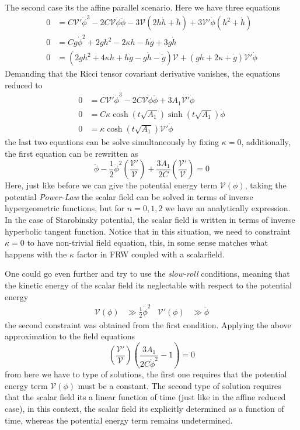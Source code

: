 \documentclass[10pt,a4paper]{article}
\begin{document}
The second case its the affine parallel scenario. Here we have three equations
\begin{align}
  0 & = C\mathcal{V}'\dot{\phi}^3-2C\mathcal{V}\dot{\phi}\ddot{\phi} - 3\mathcal{V}\left(2h\dot{h} + \ddot{h}\right) + 3\mathcal{V}'\dot{\phi}
  \left(h^{2} + \dot{h}\right) \\
  0 & = Cg\dot{\phi}^2 + 2gh^2 - 2\kappa h - h\dot{g} + 3g\dot{h} \\
  0 & = \left(2gh^2 + 4\kappa h +h\dot{g} - g \dot{h} - \ddot{g}\right)\mathcal{V} + \left(gh + 2\kappa + \dot{g}\right)\mathcal{V}'\dot{\phi}
\end{align}
Demanding that the Ricci tensor covariant derivative vanishes, the equations reduced to
\begin{align}
  0 & = C\mathcal{V}'\dot{\phi}^3 - 2C\mathcal{V}\dot{\phi}\ddot{\phi} + 3A_1 \mathcal{V}'\dot{\phi}\\
  0 & = C\kappa \cosh(t\sqrt{A_1})\sinh(t\sqrt{A_1})\dot{\phi} \\
  0 & = \kappa \cosh(t\sqrt{A_1})\mathcal{V}'\dot{\phi}
\end{align}
the last two equations can be solve simultaneously by fixing $\kappa = 0$, additionally, the first equation can be rewritten as
\begin{equation}
  \ddot{\phi} - \frac{1}{2}\dot{\phi}^2\left(\frac{\mathcal{V}'}{\mathcal{V}}\right) + \frac{3A_1}{2C}\left(\frac{\mathcal{V}'}{\mathcal{V}}\right) = 0
\end{equation}
Here, just like before we can give the potential energy term $\mathcal{V}(\phi)$, taking the potential \textit{Power-Law} the scalar field
can be solved in terms of inverse hypergeometric functions, but for $n = 0 , 1 , 2$ we have an analytically expression. In the case of Starobinsky
potential, the scalar field is written in terms of inverse hyperbolic tangent function. Notice that in this situation, we need to constraint $\kappa = 0$ to have non-trivial field equation, this, in some sense matches what
happens with the $\kappa$ factor in FRW coupled with a scalarfield. 

One could go even further and try to use the \textit{slow-roll} conditions, meaning that the kinetic energy of the scalar field its 
neglectable with respect to the potential energy
\begin{align}
  \mathcal{V}(\phi) & \gg  \frac{1}{2}\dot{\phi}^2 & \mathcal{V}'(\phi) & \gg \ddot{\phi}
\end{align}
the second constraint was obtained from the first condition. Applying the above approximation to the field equations
\begin{equation}
  \left(\frac{\mathcal{V}'}{\mathcal{V}}\right)\left(\frac{3A_1}{2C\dot{\phi}^2} -1 \right)= 0
\end{equation}
from here we have to type of solutions, the first one requires that the potential energy term $\mathcal{V}(\phi)$ must be a constant. The second
type of solution requires that the scalar field its a linear function of time (just like in the affine reduced case), in this context, the scalar field its explicitly determined
as a function of time, whereas the potential energy term remains undetermined. 
\end{document}
